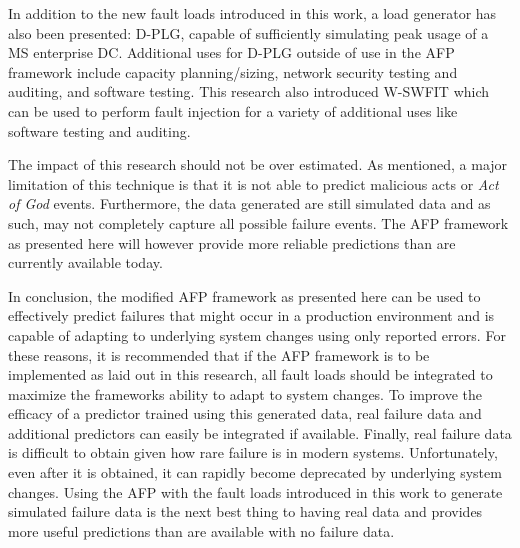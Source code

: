 In addition to the new fault loads introduced in this work, a load generator
has also been presented:  \ac{D-PLG}, capable of sufficiently simulating peak
usage of a \ac{MS} enterprise \ac{DC}.  Additional uses for \ac{D-PLG} outside
of use in the \ac{AFP} framework include capacity planning/sizing, network
security testing and auditing, and software testing.  This research also
introduced \ac{W-SWFIT} which can be used to perform fault injection for a
variety of additional uses like software testing and auditing.

The impact of this research should not be over estimated.  As mentioned, a
major limitation of this technique is that it is not able to predict malicious
acts or \emph{Act of God} events.  Furthermore, the data generated are still
simulated data and as such, may not completely capture all possible failure
events.  The \ac{AFP} framework as presented here will however provide more
reliable predictions than are currently available today.

In conclusion, the modified \ac{AFP} framework as presented here can be used to
effectively predict failures that might occur in a production environment and
is capable of adapting to underlying system changes using only reported errors.
For these reasons, it is recommended that if the \ac{AFP} framework is to be
implemented as laid out in this research, all fault loads should be integrated
to maximize the frameworks ability to adapt to system changes.  To improve the
efficacy of a predictor trained using this generated data, real failure data
and additional predictors can easily be integrated if available.  Finally, real
failure data is difficult to obtain given how rare failure is in modern
systems.  Unfortunately, even after it is obtained, it can rapidly become
deprecated by underlying system changes.  Using the \ac{AFP} with the fault
loads introduced in this work to generate simulated failure data is the next
best thing to having real data and provides more useful predictions than are
available with no failure data.
